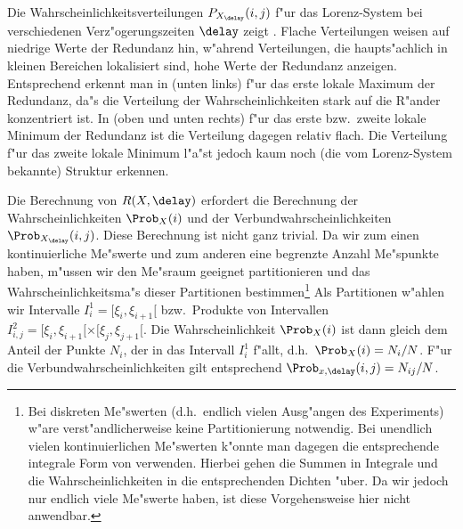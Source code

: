 Die Wahrscheinlichkeitsverteilungen $P_{X_\delay}(i,j)$ f"ur das Lorenz-System bei
verschiedenen Verz"ogerungszeiten $\delay$ zeigt . Flache Verteilungen
weisen auf niedrige Werte der Redundanz hin, w"ahrend Verteilungen, die haupts"achlich in
kleinen Bereichen lokalisiert sind, hohe Werte der Redundanz anzeigen.  Entsprechend
erkennt man in  (unten links) f"ur das erste lokale Maximum der
Redundanz, da"s die Verteilung der Wahrscheinlichkeiten stark auf die R"ander konzentriert
ist.  In  (oben und unten rechts) f"ur das erste bzw.\ zweite lokale
Minimum der Redundanz ist die Verteilung dagegen relativ flach. Die Verteilung f"ur das
zweite lokale Minimum l"a"st jedoch kaum noch (die vom Lorenz-System bekannte) Struktur
erkennen.

Die Berechnung von $R(X,\delay)$ erfordert die Berechnung der Wahrscheinlichkeiten
$\Prob_X(i)$ und der Verbundwahrscheinlichkeiten $\Prob_{X_\delay}(i,j)$. Diese Berechnung
ist nicht ganz trivial. Da wir zum einen kontinuierliche Me"swerte und zum anderen eine
begrenzte Anzahl Me"spunkte haben, m"ussen wir den Me"sraum geeignet partitionieren und
das Wahrscheinlichkeitsma"s dieser Partitionen bestimmen\footnote{Bei diskreten Me"swerten
  (d.h.\ endlich vielen Ausg"angen des Experiments) w"are verst"andlicherweise keine
  Partitionierung notwendig. Bei unendlich vielen kontinuierlichen Me"swerten k"onnte man
  dagegen die entsprechende integrale Form von  verwenden. Hierbei
  gehen die Summen in Integrale und die Wahrscheinlichkeiten in die entsprechenden Dichten
  "uber. Da wir jedoch nur endlich viele Me"swerte haben, ist diese Vorgehensweise hier
  nicht anwendbar.}  Als Partitionen w"ahlen wir Intervalle $I^1_i=[\xi_i,\xi_{i+1}[$
bzw.\ Produkte von Intervallen $I^2_{i,j}=[\xi_i,\xi_{i+1}[\times[\xi_j,\xi_{j+1}[$. Die
Wahrscheinlichkeit $\Prob_X(i)$ ist dann gleich dem Anteil der Punkte $N_i$, der in das
Intervall $I^1_i$ f"allt, d.h.\ $\Prob_X(i)=N_i/N$. F"ur die Verbundwahrscheinlichkeiten
gilt entsprechend $\Prob_{x,\delay}(i,j)=N_{ij}/N$.

